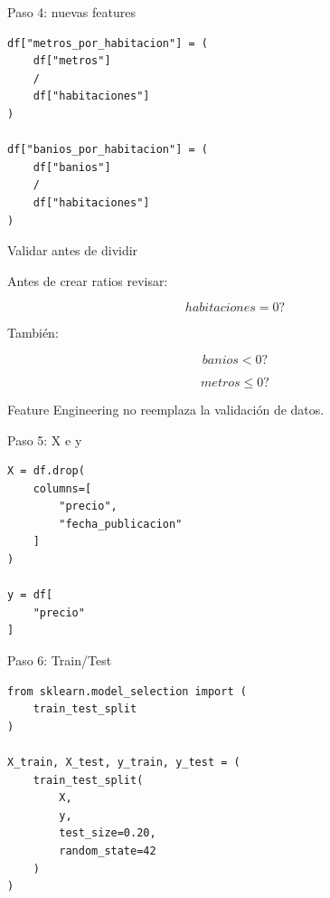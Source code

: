 \documentclass[aspectratio=169,11pt]{beamer}
\begin{document}

\begin{frame}[fragile]{Paso 4: nuevas features}

\begin{lstlisting}
df["metros_por_habitacion"] = (
    df["metros"]
    /
    df["habitaciones"]
)

df["banios_por_habitacion"] = (
    df["banios"]
    /
    df["habitaciones"]
)
\end{lstlisting}

\end{frame}


\begin{frame}{Validar antes de dividir}

Antes de crear ratios revisar:

\[
habitaciones=0?
\]

También:

\[
banios<0?
\]

\[
metros\leq0?
\]

\vspace{0.4cm}

Feature Engineering no reemplaza la validación de datos.

\end{frame}


\begin{frame}[fragile]{Paso 5: X e y}

\begin{lstlisting}
X = df.drop(
    columns=[
        "precio",
        "fecha_publicacion"
    ]
)

y = df[
    "precio"
]
\end{lstlisting}

\end{frame}


\begin{frame}[fragile]{Paso 6: Train/Test}

\begin{lstlisting}
from sklearn.model_selection import (
    train_test_split
)

X_train, X_test, y_train, y_test = (
    train_test_split(
        X,
        y,
        test_size=0.20,
        random_state=42
    )
)
\end{lstlisting}

\end{frame}
\end{document}
